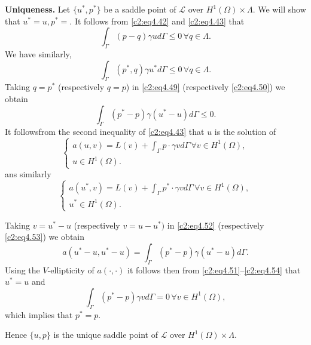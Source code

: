 \textbf{Uniqueness.} Let $\{u^*, p^*\}$  be a saddle point of
$\mathscr{L}$ over $H^1(\Omega) \times \Lambda$. We will show that $u^*
= u, p^* =$. It follows from \eqref{c2:eq4.42} and \eqref{c2:eq4.43} that  
\begin{equation}
\int_\Gamma (p-q) \gamma u d \Gamma  \leq 0\, \forall  q \in
\Lambda. \tag{4.49}\label{c2:eq4.49} 
\end{equation}
We have similarly,
\begin{equation}
\int_\Gamma (p^*, q) \gamma u^* d \Gamma \leq 0\, \forall  q \in
\Lambda. \tag{4.50}\label{c2:eq4.50} 
\end{equation}
Taking $q = p^*$ (respectively $q=p$) in \eqref{c2:eq4.49} (respectively \eqref{c2:eq4.50})
we obtain  
\begin{equation}
\int_\Gamma  (p^* - p) \gamma (u^* - u) d \Gamma \leq 0. \tag{4.51}\label{c2:eq4.51} 
\end{equation}
It follows\pageoriginale  from the second inequality of \eqref{c2:eq4.43} that $u$ is the 
solution of  
\begin{equation}
\begin{cases}
a(u, v) = L(v) + \int_\Gamma p \cdot \gamma v d \Gamma\, \forall  v
\in H^1 (\Omega) ,\\ 
u \in H^1(\Omega). \tag{4.52}\label{c2:eq4.52}
\end{cases}
\end{equation}
ans similarly 
\begin{equation}
\begin{cases}
a(u^*, v) = L(v) + \int_\Gamma p^* \cdot \gamma v d \Gamma\, \forall  v
\in H^1 (\Omega),\\ 
 u^* \in H^1 (\Omega). \tag{4.53}\label{c2:eq4.53}
\end{cases}
\end{equation}

Taking $v = u^*-u$ (respectively  $v = u - u^*)$ in \eqref{c2:eq4.52}
(respectively \eqref{c2:eq4.53}) we obtain 
\begin{equation}
a(u^*-u,u^*-u) = \int_\Gamma  (p^*-p) \gamma (u^*-u)
d\Gamma.\tag{4.54}\label{c2:eq4.54} 
\end{equation}
Using the $V$-ellipticity of $a(\cdot, \cdot)$ it follows then from
\eqref{c2:eq4.51}--\eqref{c2:eq4.54} that $u^* =u$ and  
$$
\int_\Gamma (p^* - p) \gamma v d \Gamma = 0\, \forall  v \in H^1
(\Omega), 
$$
which implies that $p^* = p$. 

Hence $\{u, p\}$ is the unique  saddle point of $\mathscr{L}$ over
$H^1 (\Omega) \times \Lambda$. 

